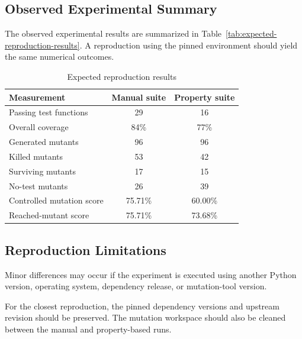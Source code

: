 \documentclass[12pt]{article}
\begin{document}
\subsection{Observed Experimental Summary}

The observed experimental results are summarized in
Table~\ref{tab:expected-reproduction-results}. A reproduction using the pinned
environment should yield the same numerical outcomes.

\begin{table}[H]
\centering
\caption{Expected reproduction results}
\label{tab:observed-reproduction-results}

\begin{tabular}{|p{4.7cm}|c|c|}
\hline
\textbf{Measurement} &
\textbf{Manual suite} &
\textbf{Property suite} \\
\hline

Passing test functions &
29 &
16 \\
\hline

Overall coverage &
84\% &
77\% \\
\hline

Generated mutants &
96 &
96 \\
\hline

Killed mutants &
53 &
42 \\
\hline

Surviving mutants &
17 &
15 \\
\hline

No-test mutants &
26 &
39 \\
\hline

Controlled mutation score &
75.71\% &
60.00\% \\
\hline

Reached-mutant score &
75.71\% &
73.68\% \\
\hline

\end{tabular}
\end{table}

\subsection{Reproduction Limitations}

Minor differences may occur if the experiment is executed using another Python
version, operating system, dependency release, or mutation-tool version.

For the closest reproduction, the pinned dependency versions and upstream
revision should be preserved. The mutation workspace should also be cleaned between the manual and property-based runs.
\end{document}
